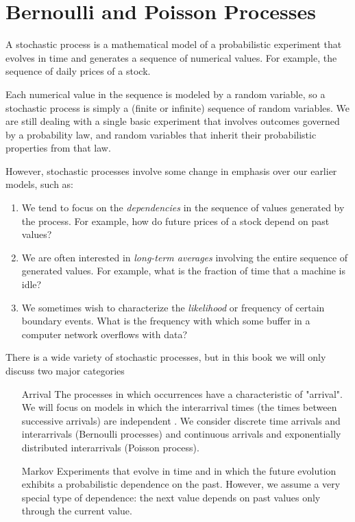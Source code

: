 \chapter{Bernoulli and Poisson Processes}
A stochastic process is a mathematical model of a probabilistic experiment that evolves in time and generates a sequence of numerical values. For example, the sequence of daily prices of a stock.

Each numerical value in the sequence is modeled by a random variable, so a stochastic process  is simply a  (finite or  infinite) sequence of random variables. We are still dealing with a single basic experiment that involves outcomes governed by a probability law, and random variables that inherit their probabilistic properties from that law.

However, stochastic processes involve some change in emphasis over our earlier models, such as:
\begin{enumerate}
    \item We tend to focus on the \textit{dependencies} in the sequence of values generated by  the process. For example, how do  future  prices of a stock depend on past values?
    \item We  are often interested in \textit{long-term averages} involving the entire sequence of generated values. For example, what is the fraction of time that a machine is idle?
    \item We  sometimes wish to characterize the \textit{likelihood} or frequency of certain boundary events. What is the frequency with which some buffer in a computer net­work overflows with data?
\end{enumerate}
There is a wide variety of stochastic processes, but in this book we will only discuss two major categories
\begin{enumerate}
    \item [Arrival] The processes in which occurrences have a characteristic of "arrival". We  will focus on models in which the interarrival times (the times between successive arrivals) are independent \rv. We consider discrete time arrivals and interarrivals (Bernoulli processes) and continuous arrivals and exponentially distributed interarrivals (Poisson process).
    \item [Markov] Experiments that evolve in time and in which the future evolution exhibits a probabilistic dependence on the past. However, we assume a very special type of dependence: the next value depends on past values only through the current value.
\end{enumerate}

